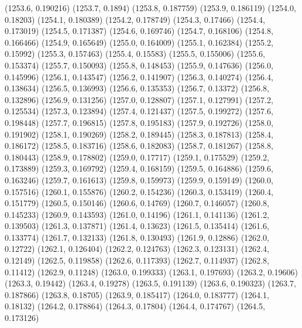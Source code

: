 {					(1253.6, 0.190216)
					(1253.7, 0.1894)
					(1253.8, 0.187759)
					(1253.9, 0.186119)
					(1254.0, 0.18203)
					(1254.1, 0.180389)
					(1254.2, 0.178749)
					(1254.3, 0.17466)
					(1254.4, 0.173019)
					(1254.5, 0.171387)
					(1254.6, 0.169746)
					(1254.7, 0.168106)
					(1254.8, 0.166466)
					(1254.9, 0.165649)
					(1255.0, 0.164009)
					(1255.1, 0.162384)
					(1255.2, 0.15992)
					(1255.3, 0.157463)
					(1255.4, 0.15583)
					(1255.5, 0.155006)
					(1255.6, 0.153374)
					(1255.7, 0.150093)
					(1255.8, 0.148453)
					(1255.9, 0.147636)
					(1256.0, 0.145996)
					(1256.1, 0.143547)
					(1256.2, 0.141907)
					(1256.3, 0.140274)
					(1256.4, 0.138634)
					(1256.5, 0.136993)
					(1256.6, 0.135353)
					(1256.7, 0.13372)
					(1256.8, 0.132896)
					(1256.9, 0.131256)
					(1257.0, 0.128807)
					(1257.1, 0.127991)
					(1257.2, 0.125534)
					(1257.3, 0.123894)
					(1257.4, 0.121437)
					(1257.5, 0.199272)
					(1257.6, 0.198448)
					(1257.7, 0.196815)
					(1257.8, 0.195183)
					(1257.9, 0.192726)
					(1258.0, 0.191902)
					(1258.1, 0.190269)
					(1258.2, 0.189445)
					(1258.3, 0.187813)
					(1258.4, 0.186172)
					(1258.5, 0.183716)
					(1258.6, 0.182083)
					(1258.7, 0.181267)
					(1258.8, 0.180443)
					(1258.9, 0.178802)
					(1259.0, 0.17717)
					(1259.1, 0.175529)
					(1259.2, 0.173889)
					(1259.3, 0.169792)
					(1259.4, 0.168159)
					(1259.5, 0.164886)
					(1259.6, 0.163246)
					(1259.7, 0.161613)
					(1259.8, 0.159973)
					(1259.9, 0.159149)
					(1260.0, 0.157516)
					(1260.1, 0.155876)
					(1260.2, 0.154236)
					(1260.3, 0.153419)
					(1260.4, 0.151779)
					(1260.5, 0.150146)
					(1260.6, 0.14769)
					(1260.7, 0.146057)
					(1260.8, 0.145233)
					(1260.9, 0.143593)
					(1261.0, 0.14196)
					(1261.1, 0.141136)
					(1261.2, 0.139503)
					(1261.3, 0.137871)
					(1261.4, 0.13623)
					(1261.5, 0.135414)
					(1261.6, 0.133774)
					(1261.7, 0.132133)
					(1261.8, 0.130493)
					(1261.9, 0.12886)
					(1262.0, 0.12722)
					(1262.1, 0.126404)
					(1262.2, 0.124763)
					(1262.3, 0.123131)
					(1262.4, 0.12149)
					(1262.5, 0.119858)
					(1262.6, 0.117393)
					(1262.7, 0.114937)
					(1262.8, 0.11412)
					(1262.9, 0.11248)
					(1263.0, 0.199333)
					(1263.1, 0.197693)
					(1263.2, 0.19606)
					(1263.3, 0.19442)
					(1263.4, 0.19278)
					(1263.5, 0.191139)
					(1263.6, 0.190323)
					(1263.7, 0.187866)
					(1263.8, 0.18705)
					(1263.9, 0.185417)
					(1264.0, 0.183777)
					(1264.1, 0.18132)
					(1264.2, 0.178864)
					(1264.3, 0.17804)
					(1264.4, 0.174767)
					(1264.5, 0.173126)
}
